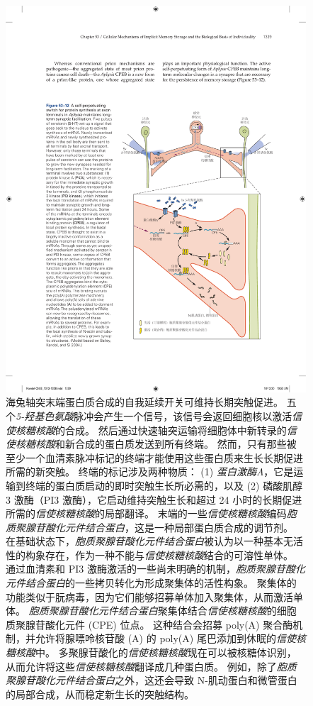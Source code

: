 \begin{figure}[htbp]
	\centering
	\includegraphics[width=0.75\linewidth]{chap53/fig_53_12}
	\caption{海兔轴突末端蛋白质合成的自我延续开关可维持长期突触促进。
		五个\textit{5-羟基色氨酸}脉冲会产生一个信号，该信号会返回细胞核以激活\textit{信使核糖核酸}的合成。
		然后通过快速轴突运输将细胞体中新转录的\textit{信使核糖核酸}和新合成的蛋白质发送到所有终端。
		然而，只有那些被至少一个血清素脉冲标记的终端才能使用这些蛋白质来生长长期促进所需的新突触。
		终端的标记涉及两种物质：
		(1) \textit{蛋白激酶A}，它是运输到终端的蛋白质启动的即时突触生长所必需的，以及 (2) 磷酸肌醇 3 激酶（PI3 激酶），它启动维持突触生长和超过 24 小时的长期促进所需的\textit{信使核糖核酸}的局部翻译。 末端的一些\textit{信使核糖核酸}编码\textit{胞质聚腺苷酸化元件结合蛋白}，这是一种局部蛋白质合成的调节剂。
		在基础状态下，\textit{胞质聚腺苷酸化元件结合蛋白}被认为以一种基本无活性的构象存在，作为一种不能与\textit{信使核糖核酸}结合的可溶性单体。
		通过血清素和 PI3 激酶激活的一些尚未明确的机制，\textit{胞质聚腺苷酸化元件结合蛋白}的一些拷贝转化为形成聚集体的活性构象。
		聚集体的功能类似于朊病毒，因为它们能够招募单体加入聚集体，从而激活单体。
		\textit{胞质聚腺苷酸化元件结合蛋白}聚集体结合\textit{信使核糖核酸}的细胞质聚腺苷酸化元件 (CPE) 位点。
		这种结合会招募 poly(A) 聚合酶机制，并允许将腺嘌呤核苷酸 (A) 的 poly(A) 尾巴添加到休眠的\textit{信使核糖核酸}中。
		多聚腺苷酸化的\textit{信使核糖核酸}现在可以被核糖体识别，从而允许将这些\textit{信使核糖核酸}翻译成几种蛋白质。
		例如，除了\textit{胞质聚腺苷酸化元件结合蛋白}之外，这还会导致 N-肌动蛋白和微管蛋白的局部合成，从而稳定新生长的突触结构\cite{bailey2004persistence}。}
	\label{fig:53_12}
\end{figure}


